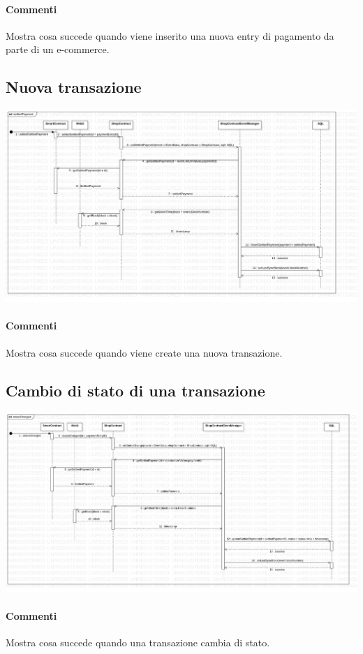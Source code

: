 \documentclass[a4paper, 12pt]{article}
\begin{document}
\paragraph{Commenti}
Mostra cosa succede quando viene inserito una nuova entry di pagamento da parte di un e-commerce.

\subsection{Nuova transazione}
\includegraphics[width=1.0\textwidth]{settledPayment}
\paragraph{Commenti}
Mostra cosa succede quando viene create una nuova transazione.

\subsection{Cambio di stato di una transazione}
\includegraphics[width=1.0\textwidth]{statusChanged}
\paragraph{Commenti}
Mostra cosa succede quando una transazione cambia di stato.
\end{document}
